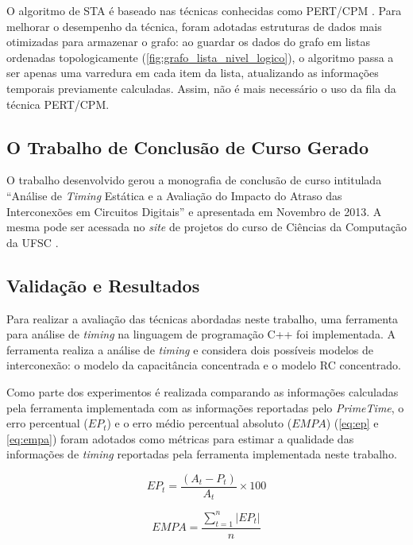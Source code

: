 \documentclass[
	12pt,				%
	openright,			%
	twoside,			%
	a4paper,			%
	english,			%
	french,				%
	spanish,			%
	brazil,				%
	]{abntex2}
\begin{document}
O algoritmo de STA é baseado nas técnicas conhecidas como PERT/CPM \cite{BhaskerChadha09}. Para melhorar o desempenho da técnica, foram adotadas estruturas de dados mais otimizadas para armazenar o grafo: ao guardar os dados do grafo em listas ordenadas topologicamente (\autoref{fig:grafo_lista_nivel_logico}), o algoritmo passa a ser apenas uma varredura em cada item da lista, atualizando as informações temporais previamente calculadas. Assim, não é mais necessário o uso da fila da técnica PERT/CPM.

\subsection{O Trabalho de Conclusão de Curso Gerado}
\label{sec:tcc}
O trabalho desenvolvido gerou a monografia de conclusão de curso intitulada ``Análise de \textit{Timing} Estática e a Avaliação do Impacto do Atraso das Interconexões em Circuitos Digitais'' e apresentada em Novembro de 2013. A mesma pode ser acessada no \textit{site} de projetos do curso de Ciências da Computação da UFSC \cite{linkTCC}.


\subsection{Validação e Resultados}

Para realizar a avaliação das técnicas abordadas neste trabalho, uma ferramenta para análise de \textit{timing} na linguagem de programação C++ foi implementada. A ferramenta realiza a análise de \textit{timing} e considera dois possíveis modelos de interconexão: o modelo da capacitância concentrada e o modelo RC concentrado.

Como parte dos experimentos é realizada comparando as informações calculadas pela ferramenta implementada com as informações reportadas pelo \textit{PrimeTime}, o erro percentual ($EP_t$) e o erro médio percentual absoluto ($EMPA$) (\autoref{eq:ep} e \autoref{eq:empa}) foram adotados como métricas para estimar a qualidade das informações de \textit{timing} reportadas pela ferramenta implementada neste trabalho.

\begin{equation}
\label{eq:ep}
EP_t = \frac{(A_t - P_t)}{A_t} \times 100
\end{equation}

\begin{equation}
\label{eq:empa}
EMPA = \frac{\sum_{t=1}^n |EP_t|}{n}
\end{equation}
\end{document}
